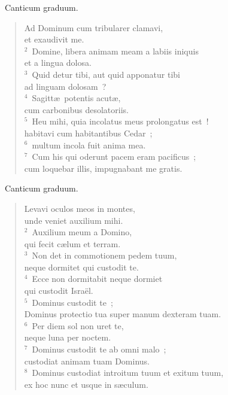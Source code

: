 ~\lettrine[lines=10,image=true,loversize=0.05,lraise=-0.03]{C}{}anticum graduum. \begin{flushleft}\begin{verse}\vspace{6pt}Ad Dominum cum tribularer clamavi,\\ et exaudivit me.\\
${}^{2}$~Domine, libera animam meam a labiis iniquis\\ et a lingua dolosa.\\
${}^{3}$~Quid detur tibi, aut quid apponatur tibi\\ ad linguam dolosam~?\\
${}^{4}$~Sagitt\ae\ potentis acut\ae ,\\ cum carbonibus desolatoriis.\\
${}^{5}$~Heu mihi, quia incolatus meus prolongatus est~!\\ habitavi cum habitantibus Cedar~;\\
${}^{6}$~multum incola fuit anima mea.\\
${}^{7}$~Cum his qui oderunt pacem eram pacificus~;\\ cum loquebar illis, impugnabant me gratis.\end{verse}\end{flushleft}


~\lettrine[lines=10,image=true,loversize=0.05,lraise=-0.03]{C}{}anticum graduum. \begin{flushleft}\begin{verse}\vspace{6pt}Levavi oculos meos in montes,\\ unde veniet auxilium mihi.\\
${}^{2}$~Auxilium meum a Domino,\\ qui fecit c\ae lum et terram.\\
${}^{3}$~Non det in commotionem pedem tuum,\\ neque dormitet qui custodit te.\\
${}^{4}$~Ecce non dormitabit neque dormiet\\ qui custodit Isra\"el.\\
${}^{5}$~Dominus custodit te~;\\ Dominus protectio tua super manum dexteram tuam.\\
${}^{6}$~Per diem sol non uret te,\\ neque luna per noctem.\\
${}^{7}$~Dominus custodit te ab omni malo~;\\ custodiat animam tuam Dominus.\\
${}^{8}$~Dominus custodiat introitum tuum et exitum tuum,\\ ex hoc nunc et usque in s\ae culum.\end{verse}\end{flushleft}


